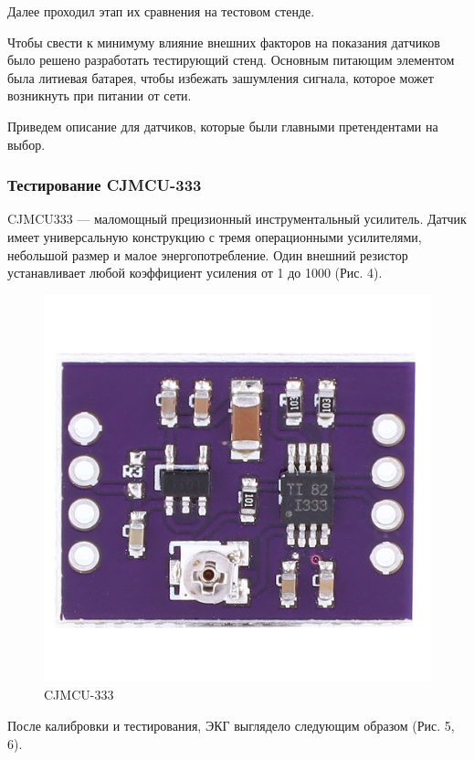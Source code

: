 \documentclass[12pt, russian]{extarticle}
\begin{document}
\begin{spacing}{1.5}
Далее проходил этап их сравнения на тестовом стенде.

Чтобы свести к минимуму влияние внешних факторов на показания датчиков было решено разработать тестирующий стенд.
Основным питающим элементом была литиевая батарея, чтобы избежать зашумления сигнала, которое может возникнуть при питании от сети.

Приведем описание для датчиков, которые были главными претендентами на выбор.

\subsubsection{Тестирование CJMCU-333}

CJMCU333 — маломощный прецизионный инструментальный усилитель. Датчик имеет универсальную конструкцию с тремя операционными усилителями, небольшой размер и малое энергопотребление. Один внешний резистор устанавливает любой коэффициент усиления от 1 до 1000 (Рис. 4).

\begin{figure}[htbp]
\centering
\includegraphics[scale=0.15]{resources/cjmcu333/cjmcu-333.png}
\caption{CJMCU-333}
\label{fig:my_label}
\end{figure}

После калибровки и тестирования, ЭКГ выглядело следующим образом (Рис. 5, 6).


\end{spacing}
\end{document}
